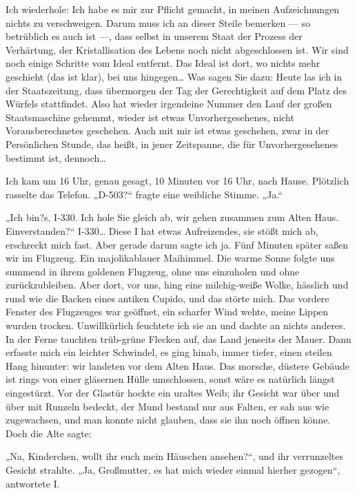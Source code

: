Ich wiederhole: Ich habe es mir zur Pflicht gemacht, in meinen
Aufzeichnungen nichts zu verschweigen. Darum muss ich an dieser
Steile bemerken — so betrüblich es auch ist —, dass selbst in
unserem Staat der Prozess der Verhärtung, der Kristallisation des
Lebens noch nicht abgeschlossen ist. Wir sind noch einige Schritte
vom Ideal entfernt. Das Ideal ist dort, wo nichts mehr geschieht
(das ist klar), bei uns hingegen\ldots{} Was sagen Sie dazu: Heute las
ich in der Staatszeitung, dass übermorgen der Tag der Gerechtigkeit
auf dem Platz des Würfels stattfindet. Also hat wieder irgendeine
Nummer den Lauf der großen Staatsmaschine gehemmt, wieder ist etwas
Unvorhergesehenes, nicht Vorausberechnetes geschehen. Auch mit mir
ist etwas geschehen, zwar in der Persönlichen Stunde, das heißt, in
jener Zeitspanne, die für Unvorhergesehenes bestimmt ist,
dennoch\ldots{}

Ich kam um 16 Uhr, genau gesagt, 10 Minuten vor 16 Uhr, nach Hause.
Plötzlich rasselte das Telefon. „D-503?“ fragte eine weibliche
Stimme. „Ja.“

„Ich bin?s, I-330. Ich hole Sie gleich ab, wir gehen zusammen zum
Alten Haus. Einverstanden?“ I-330\ldots{} Diese I hat etwas
Aufreizendes, sie stößt mich ab, erschreckt mich fast. Aber gerade
darum sagte ich ja. Fünf Minuten später saßen wir im Flugzeug. Ein
majolikablauer Maihimmel. Die warme Sonne folgte uns summend in
ihrem goldenen Flugzeug, ohne uns einzuholen und ohne
zurückzubleiben. Aber dort, vor uns, hing eine milchig-weiße Wolke,
hässlich und rund wie die Backen eines antiken Cupido, und das
störte mich. Das vordere Fenster des Flugzeuges war geöffnet, ein
scharfer Wind wehte, meine Lippen wurden trocken. Unwillkürlich
feuchtete ich sie an und dachte an nichts anderes. In der Ferne
tauchten trüb-grüne Flecken auf, das Land jenseits der Mauer. Dann
erfasste mich ein leichter Schwindel, es ging hinab, immer tiefer,
einen steilen Hang hinunter: wir landeten vor dem Alten Haus. Das
morsche, düstere Gebäude ist rings von einer gläsernen Hülle
umschlossen, sonst wäre es natürlich längst eingestürzt. Vor der
Glastür hockte ein uraltes Weib; ihr Gesicht war über und über mit
Runzeln bedeckt, der Mund bestand nur aus Falten, er sah aus wie
zugewachsen, und man konnte nicht glauben, dass sie ihn noch öffnen
könne. Doch die Alte sagte:

„Na, Kinderchen, wollt ihr euch mein Häuschen ansehen?“, und ihr
verrunzeltes Gesicht strahlte. „Ja, Großmutter, es hat mich wieder
einmal hierher gezogen“, antwortete I.

